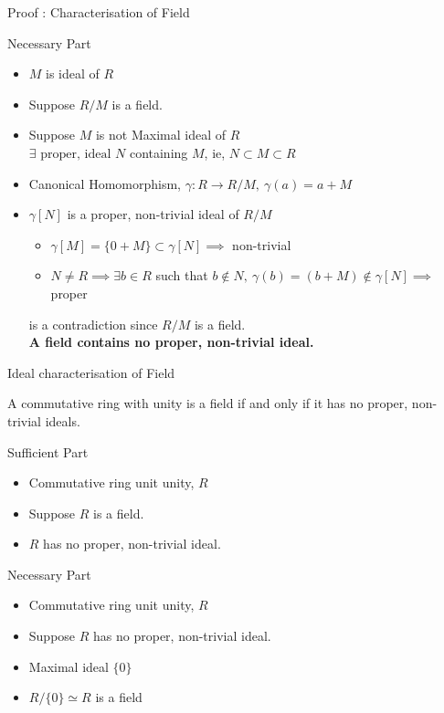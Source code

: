 \documentclass{beamer}
\begin{document}
\begin{frame}{Proof : Characterisation of Field}
\begin{block}{Necessary Part}
\begin{itemize}
	\item $M$ is ideal of $R$
	\item Suppose $R/M$ is a field.
	\item Suppose $M$ is not Maximal ideal of $R$\\
		$\exists \text{ proper, ideal }N$ containing $M$, ie, $N \subset M \subset R$
	\item Canonical Homomorphism, $\gamma : R \to R/M,\ \gamma(a) = a+M$
	\item $\gamma[N]$ is a proper, non-trivial ideal of $R/M$
	\begin{itemize}
		\item $\gamma[M] = \{ 0+M \} \subset \gamma[N] \implies $ non-trivial
		\item $N \ne R \implies \exists b \in R$ such that $b \notin N,\ \gamma(b) = (b+M) \notin \gamma[N] \implies$ proper
	\end{itemize}
	is a contradiction since $R/M$ is a field.\\
		\textbf{A field contains no proper, non-trivial ideal.}
\end{itemize}
\end{block}
\end{frame}

\begin{frame}{Ideal characterisation of Field}
\begin{corollary}
	A commutative ring with unity is a field if and only if it has no proper, non-trivial ideals.
\end{corollary}
\begin{block}{Sufficient Part}
\begin{itemize}
	\item Commutative ring unit unity, $R$
	\item Suppose $R$ is a field.
	\item $R$ has no proper, non-trivial ideal.
\end{itemize}
\end{block}
\begin{block}{Necessary Part}
\begin{itemize}
	\item Commutative ring unit unity, $R$
	\item Suppose $R$ has no proper, non-trivial ideal.
	\item Maximal ideal $\{ 0 \}$
	\item $R/\{ 0 \} \simeq R $ is a field
\end{itemize}
\end{block}
\end{frame}
\end{document}
